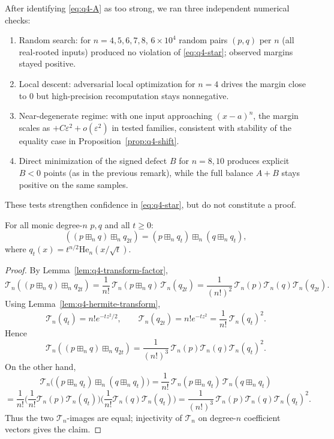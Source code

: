 \begin{remark}
After identifying \eqref{eq:q4-A} as too strong, we ran three independent numerical checks:
\begin{enumerate}
\item Random search: for $n=4,5,6,7,8$, $6\times 10^4$ random pairs $(p,q)$ per $n$ (all real-rooted inputs) produced no violation of \eqref{eq:q4-star}; observed margins stayed positive.
\item Local descent: adversarial local optimization for $n=4$ drives the margin close to $0$ but high-precision recomputation stays nonnegative.
\item Near-degenerate regime: with one input approaching $(x-a)^n$, the margin scales as $+C\varepsilon^2+o(\varepsilon^2)$ in tested families, consistent with stability of the equality case in Proposition~\ref{prop:q4-shift}.
\item Direct minimization of the signed defect $B$ for $n=8,10$ produces explicit $B<0$ points (as in the previous remark), while the full balance $A+B$ stays positive on the same samples.
\end{enumerate}
These tests strengthen confidence in \eqref{eq:q4-star}, but do not constitute a proof.
\end{remark}

\begin{lemma}\label{lem:q4-two-scale-factor}
For all monic degree-$n$ $p,q$ and all $t\ge 0$:
\[
((p\boxplus_n q)\boxplus_n q_{2t})
=
(p\boxplus_n q_t)\boxplus_n(q\boxplus_n q_t),
\]
where $q_t(x)=t^{n/2}\mathrm{He}_n(x/\sqrt t)$.
\end{lemma}

\begin{proof}
By Lemma~\ref{lem:q4-transform-factor},
\[
\mathcal T_n((p\boxplus_n q)\boxplus_n q_{2t})
=
\frac1{n!}\,\mathcal T_n(p\boxplus_n q)\,\mathcal T_n(q_{2t})
=
\frac1{(n!)^2}\,\mathcal T_n(p)\mathcal T_n(q)\mathcal T_n(q_{2t}).
\]
Using Lemma~\ref{lem:q4-hermite-transform},
\[
\mathcal T_n(q_t)=n!e^{-tz^2/2},
\qquad
\mathcal T_n(q_{2t})=n!e^{-tz^2}
=
\frac1{n!}\,\mathcal T_n(q_t)^2.
\]
Hence
\[
\mathcal T_n((p\boxplus_n q)\boxplus_n q_{2t})
=
\frac1{(n!)^3}\,\mathcal T_n(p)\mathcal T_n(q)\mathcal T_n(q_t)^2.
\]
On the other hand,
\[
\mathcal T_n\big((p\boxplus_n q_t)\boxplus_n(q\boxplus_n q_t)\big)
=
\frac1{n!}\,\mathcal T_n(p\boxplus_n q_t)\,\mathcal T_n(q\boxplus_n q_t)
\]
\[
=
\frac1{n!}\Big(\frac1{n!}\mathcal T_n(p)\mathcal T_n(q_t)\Big)
\Big(\frac1{n!}\mathcal T_n(q)\mathcal T_n(q_t)\Big)
=
\frac1{(n!)^3}\,\mathcal T_n(p)\mathcal T_n(q)\mathcal T_n(q_t)^2.
\]
Thus the two $\mathcal T_n$-images are equal; injectivity of $\mathcal T_n$
on degree-$n$ coefficient vectors gives the claim.
\end{proof}

